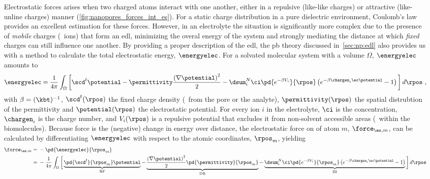 Electrostatic forces arises when two charged atoms interact with one another, either in a repulsive (like-like
charges) or attractive (like-unline charges) manner (\cref{fig:nanopores_forces_int_es}). For a static charge
distribution in a pure dielectric environment, Coulomb's law provides an excellent estimation for these
forces. However, in an electrolyte the situation is significantly more complex due to the presence of
\emph{mobile} charges (\ie~ions) that form an \gls{edl}, minimizing the overal energy of the system and
strongly mediating the distance at which \emph{fixed} charges can still influence one another. By providing a
proper description of the \gls{edl}, the \gls{pb} theory discussed in~\cref{sec:np:edl} also provides us with
a method to calculate the total electrostatic energy, $\energyelec$. For a solvated molecular system with a
volume $\Omega$, $\energyelec$ amounts to~\cite{Gilson-1993,Im-1998,Baker-2005}
%
\begin{align}\label{eq:nanopores_electrostatic_energy}
  \energyelec = 
  \dfrac{1}{4 \pi} \int_{\Omega}
  \bigg[
    \scd^{\rm{f}} \potential
    - \permittivity \dfrac{\left(\nabla \potential \right)^2}{2}
    - \dsum_{i}^{N} \ci \pd{ e^{- \beta V_i} }{\rpos}
                    \left( e^{ - \beta \chargen_i \ec \potential } - 1 \right)
  \bigg] \, d\rpos
  \text{ ,}
\end{align}
%
with $\beta = (\kbt)^{-1}$, $\scd^{\rm{f}}(\rpos)$ the fixed charge density (\ie~from the pore or the
analyte), $\permittivity(\rpos)$ the spatial distrubtion of the permittivity and $\potential(\rpos)$ the
electrostatic potential. For every ion $i$ in the electrolyte, $\ci$ is the concentration, $\chargen_i$ is the
charge number, and $V_i(\rpos)$ is a repulsive potential that excludes it from non-solvent accessible areas
(\eg~within the biomolecules). Because force is the (negative) change in energy over distance, the
electrostatic force on of atom $m$, $\force_{\es,m}$, can be calculated by differentiating $\energyelec$ with
respect to the atomic coordinates, $\rpos_m$, yielding~\cite{Gilson-1993,Im-1998,Baker-2005}
%
\begin{align}\label{eq:nanopores_electrostatic_force}
  \force_{\es,m} ={}& - \pd{\energyelec}{\rpos_m} \notag \\
    ={}& - \dfrac{1}{4 \pi} \int_{\Omega} \bigg[ 
      \underbrace{ \pd{\scd^{\rm{f}}}{\rpos_m} \potential }_{ \text{RF} }
      - \underbrace{ \dfrac{\left(\nabla \potential \right)^2}{2} 
      \pd{\permittivity}{\rpos_m} }_{ \text{DB} }
      - \underbrace{ \dsum_{i}^{N}
          \ci \pd{ e^{- \beta V_i} }{\rpos_m}
          \left( e^{ - \beta \chargen_i \ec \potential } - 1 \right) }_{ \text{IB} }
          \bigg] \, d\rpos
\end{align}
